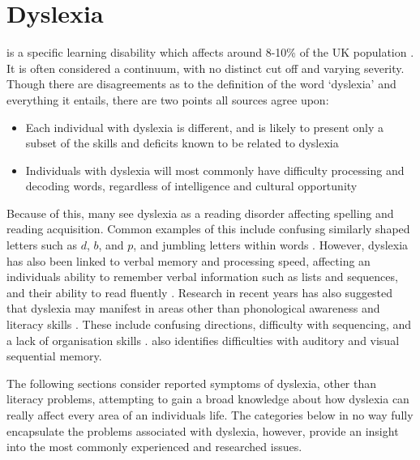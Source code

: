 \documentclass[journal]{IEEEtran}
\begin{document}
\section{Dyslexia}
\label{sec:dyslexia}

 is a specific learning disability which affects around 8-10\% of the UK population \cite{Nhs,bda}. It is often considered a continuum, with no distinct cut off and varying severity. Though there are disagreements as to the definition of the word `dyslexia' and everything it entails, there are two points all sources agree upon:
 
\begin{itemize}
\item Each individual with dyslexia is different, and is likely to present only a
	subset of the skills and deficits known to be related to dyslexia 
\item Individuals with dyslexia will most commonly have difficulty processing
	and decoding words, regardless of intelligence and cultural opportunity
\end{itemize}

Because of this, many see dyslexia as a reading disorder affecting spelling and reading acquisition. Common examples of this include confusing similarly shaped letters such as $d$, $b$, and $p$, and jumbling letters within words \cite{DetectAndManage}. However, dyslexia has also been linked to verbal memory and processing speed, affecting an individuals ability to remember verbal information such as lists and sequences, and their ability to read fluently \cite{Nhs, RoseReview}. Research in recent years has also suggested that dyslexia may manifest in areas other than phonological awareness and literacy skills \cite{snowling, DetectAndManage}.  These include confusing directions, difficulty with sequencing, and a lack of organisation skills \cite{bda}. \cite{DetectAndManage} also identifies difficulties with auditory and visual sequential memory.

The following sections consider reported symptoms of dyslexia, other than literacy problems, attempting to gain a broad knowledge about how dyslexia can really affect every area of an individuals life. The categories below in no way fully encapsulate the problems associated with dyslexia, however, provide an insight into the most commonly experienced and researched issues.
\end{document}
